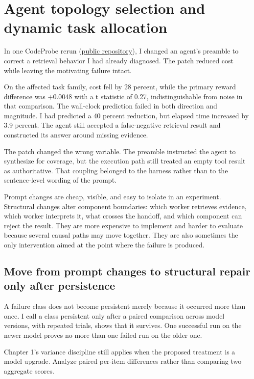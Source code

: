 \chapter{Agent topology selection and dynamic task allocation}
\label{ch17-agent-topology-dynamic-task-allocation}
In one CodeProbe rerun (\href{https://github.com/sjarmak/codeprobe}{public repository}), I changed an agent's preamble to correct a retrieval behavior I had already diagnosed. The patch reduced cost while leaving the motivating failure intact.

On the affected task family, cost fell by 28 percent, while the primary reward difference was +0.0048 with a t statistic of 0.27, indistinguishable from noise in that comparison. The wall-clock prediction failed in both direction and magnitude. I had predicted a 40 percent reduction, but elapsed time increased by 3.9 percent. The agent still accepted a false-negative retrieval result and constructed its answer around missing evidence.

The patch changed the wrong variable. The preamble instructed the agent to synthesize for coverage, but the execution path still treated an empty tool result as authoritative. That coupling belonged to the harness rather than to the sentence-level wording of the prompt.

Prompt changes are cheap, visible, and easy to isolate in an experiment. Structural changes alter component boundaries: which worker retrieves evidence, which worker interprets it, what crosses the handoff, and which component can reject the result. They are more expensive to implement and harder to evaluate because several causal paths may move together. They are also sometimes the only intervention aimed at the point where the failure is produced.

\section{Move from prompt changes to structural repair only after persistence}\label{move-from-prompt-changes-to-structural-repair-only-after-persistence}

A failure class does not become persistent merely because it occurred more than once. I call a class persistent only after a paired comparison across model versions, with repeated trials, shows that it survives. One successful run on the newer model proves no more than one failed run on the older one.

Chapter 1's variance discipline still applies when the proposed treatment is a model upgrade. Analyze paired per-item differences rather than comparing two aggregate scores.


